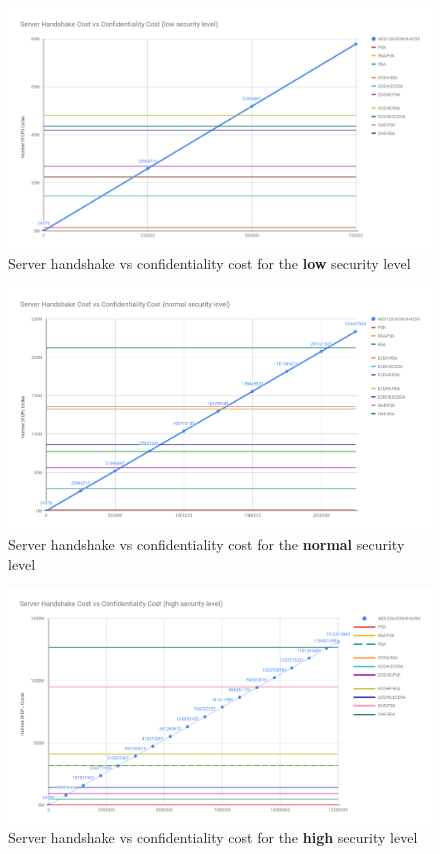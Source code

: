 \documentclass{llncs}
\begin{document}
\begin{figure}
  \centering
  \includegraphics[width=1.0\textwidth]{img/srv_conf_hs_low.png}
  \centering \caption{\label{fig:srv-conf-hs-low} Server handshake vs confidentiality cost for the \textbf{low} security level}
\end{figure}

\begin{figure}
  \centering
  \includegraphics[width=1.0\textwidth]{img/srv_conf_hs_normal.png}
  \centering \caption{\label{fig:srv-conf-hs-normal} Server handshake vs confidentiality cost for the \textbf{normal} security level}
\end{figure}

\begin{figure}
  \centering
  \includegraphics[width=1.0\textwidth]{img/srv_conf_hs_high.png}
  \centering \caption{\label{fig:srv-conf-hs-high} Server handshake vs confidentiality cost for the \textbf{high} security level}
\end{figure}
\end{document}
